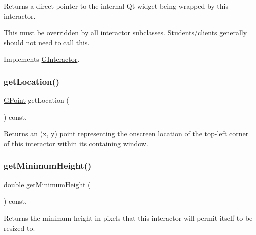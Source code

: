 Returns a direct pointer to the internal Qt widget being wrapped by this interactor. 

This must be overridden by all interactor subclasses. Students/clients generally should not need to call this. 

Implements \mbox{\hyperlink{classGInteractor}{G\+Interactor}}.

\mbox{\label{classGInteractor_a4f83802015511edeb63b892830812c11}} 
\subsubsection{\texorpdfstring{get\+Location()}{getLocation()}}
{\footnotesize\ttfamily \mbox{\hyperlink{classGPoint}{G\+Point}} get\+Location (\begin{DoxyParamCaption}{ }\end{DoxyParamCaption}) const\hspace{0.3cm}{\ttfamily [virtual]}, {\ttfamily [inherited]}}



Returns an (x, y) point representing the onscreen location of the top-\/left corner of this interactor within its containing window. 

\mbox{\label{classGInteractor_aed4b0075fcc434499c3cb3e46896bda3}} 
\subsubsection{\texorpdfstring{get\+Minimum\+Height()}{getMinimumHeight()}}
{\footnotesize\ttfamily double get\+Minimum\+Height (\begin{DoxyParamCaption}{ }\end{DoxyParamCaption}) const\hspace{0.3cm}{\ttfamily [virtual]}, {\ttfamily [inherited]}}



Returns the minimum height in pixels that this interactor will permit itself to be resized to. 

\mbox{\label{classGInteractor_a66b5af0b32493b4d597ca0a3df2049ea}} 
